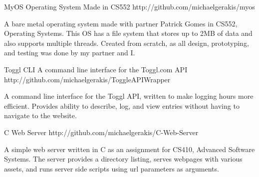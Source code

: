 


\begin{cvprojects}


\cvproject
{MyOS} %
{Operating System Made in CS552} %
{http://github.com/michaelgerakis/myos} %
{\begin{projectitem}
\item {A bare metal operating system made with partner Patrick Gomes in CS552, Operating Systems.
This OS has a file system that stores up to 2MB of data and also supports
multiple threads. Created from scratch, as all design, prototyping, and testing was done by my partner and I.} %
\end{projectitem}
}


\cvproject
{Toggl CLI} %
{A command line interface for the Toggl.com API} %
{http://github.com/michaelgerakis/ToggleAPIWrapper} %
{\begin{projectitem}
\item {A command line interface for the Toggl API, written to make logging hours
more efficient. Provides ability to describe, log, and view entries without
having to navigate to the website.} %
\end{projectitem}
}


\cvproject
{C Web Server} %
{}  %
{http://github.com/michaelgerakis/C-Web-Server} %
{\begin{projectitem}
\item {A simple web server written in C as an assignment for CS410, Advanced Software Systems. The server
provides a directory listing, serves webpages with various assets, and runs
server side scripts using url parameters as arguments.} %
\end{projectitem}
}


\end{cvprojects}
